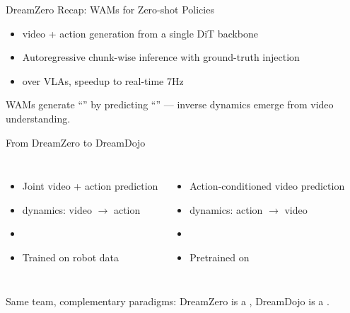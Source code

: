 \begin{frame}{DreamZero Recap: WAMs for Zero-shot Policies}
\begin{itemize}
    \item {} video + action generation
          from a single DiT backbone
    \item Autoregressive chunk-wise inference
          with ground-truth injection
    \item {} over VLAs,
           speedup to real-time 7Hz
\end{itemize}

\vspace{0.5em}
\begin{keybox}
WAMs generate ``'' by predicting
``'' ---
inverse dynamics emerge from video understanding.
\end{keybox}
\end{frame}

\begin{frame}{From DreamZero to DreamDojo}
\begin{columns}[T]
\begin{itemize}
    \item Joint video + action prediction
    \item {} dynamics:
          video $\rightarrow$ action
    \item {}
    \item Trained on robot data
\end{itemize}

\begin{itemize}
    \item Action-conditioned video prediction
    \item {} dynamics:
          action $\rightarrow$ video
    \item {}
    \item Pretrained on 
\end{itemize}
\end{columns}

\vspace{0.5em}
\begin{keybox}
Same team, complementary paradigms:
DreamZero is a , DreamDojo is a .
\end{keybox}
\end{frame}

